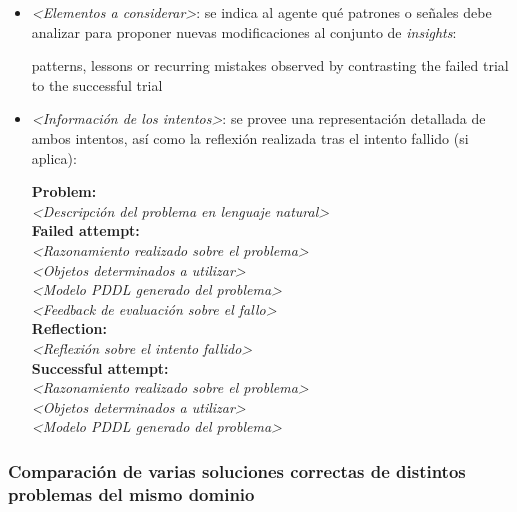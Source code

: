 \begin{anexes}
\begin{itemize}
    \item \textit{<Elementos a considerar>}: se indica al agente qué patrones o señales debe analizar para proponer nuevas modificaciones al conjunto de \textit{insights}:
\begin{tcolorbox}[colback=gray!10!white, colframe=black, title=Elementos a considerar, fonttitle=\bfseries, breakable]
patterns, lessons or recurring mistakes observed by contrasting the failed trial to the successful trial
\end{tcolorbox}

    \item \textit{<Información de los intentos>}: se provee una representación detallada de ambos intentos, así como la reflexión realizada tras el intento fallido (si aplica):
\begin{tcolorbox}[colback=gray!10!white, colframe=black, title=Información de los intentos, fonttitle=\bfseries, breakable]
\textbf{Problem:} \\
\textit{<Descripción del problema en lenguaje natural>}\\

\textbf{Failed attempt:} \\

\textit{<Razonamiento realizado sobre el problema>}\\

\textit{<Objetos determinados a utilizar>}\\

\textit{<Modelo PDDL generado del problema>}\\

\textit{<Feedback de evaluación sobre el fallo>}\\

\textbf{Reflection:} \\
\textit{<Reflexión sobre el intento fallido>}\\

\textbf{Successful attempt:} \\

\textit{<Razonamiento realizado sobre el problema>}\\

\textit{<Objetos determinados a utilizar>}\\

\textit{<Modelo PDDL generado del problema>}\\
\end{tcolorbox}
\end{itemize}

\subsubsection{Comparación de varias soluciones correctas de distintos problemas del mismo dominio}


\end{anexes}
